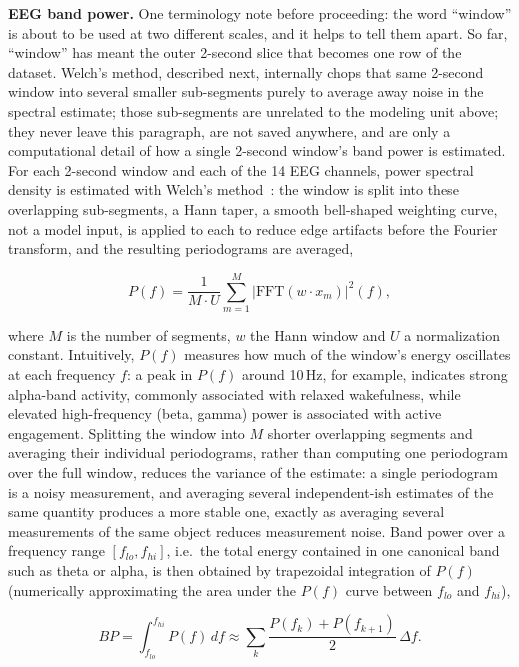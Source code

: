\documentclass[conference]{IEEEtran}
\begin{document}
\textbf{EEG band power.} One terminology note before proceeding: the word
``window'' is about to be used at two different scales, and it helps to
tell them apart. So far, ``window'' has meant the outer 2-second slice
that becomes one row of the dataset. Welch's method, described next,
internally chops that same 2-second window into several smaller
sub-segments purely to average away noise in the spectral estimate; those
sub-segments are unrelated to the modeling unit above; they never leave
this paragraph, are not saved anywhere, and are only a computational
detail of how a single 2-second window's band power is estimated. For
each 2-second window and each of the 14 EEG channels, power spectral
density is estimated with Welch's
method~\cite{welch1967psd}: the window is split into these overlapping
sub-segments, a Hann taper, a smooth bell-shaped weighting curve, not a
model input, is applied to each to reduce edge artifacts before the
Fourier transform, and the resulting periodograms are averaged,

\begin{equation}
P(f) = \frac{1}{M \cdot U} \sum_{m=1}^{M} \left| \text{FFT}(w \cdot x_m) \right|^2(f),
\label{eq:welch}
\end{equation}

\noindent where $M$ is the number of segments, $w$ the Hann window and $U$
a normalization constant. Intuitively, $P(f)$ measures how much of the
window's energy oscillates at each frequency $f$: a peak in $P(f)$ around
10\,Hz, for example, indicates strong alpha-band activity, commonly
associated with relaxed wakefulness, while elevated high-frequency (beta,
gamma) power is associated with active engagement. Splitting the window
into $M$ shorter overlapping segments and averaging their individual
periodograms, rather than computing one periodogram over the full window,
reduces the variance of the estimate: a single periodogram is a noisy
measurement, and averaging several independent-ish estimates of the same
quantity produces a more stable one, exactly as averaging several
measurements of the same object reduces measurement noise. Band power
over a frequency range $[f_{lo}, f_{hi}]$, i.e.\ the total energy
contained in one canonical band such as theta or alpha, is then obtained
by trapezoidal integration of $P(f)$ (numerically approximating the area
under the $P(f)$ curve between $f_{lo}$ and $f_{hi}$),

\begin{equation}
BP = \int_{f_{lo}}^{f_{hi}} P(f)\, df \approx \sum_{k} \frac{P(f_k) + P(f_{k+1})}{2}\, \Delta f.
\label{eq:bandpower}
\end{equation}
\end{document}
